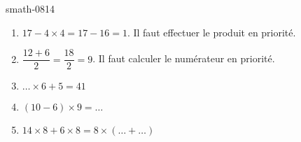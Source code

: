 
\begin{corrige}{smath-0814}

    \begin{enumerate}
        \item
            \( 17-4\times 4=17-16=1\). Il faut effectuer le produit en priorité.
        \item
            \( \dfrac{ 12+6 }{ 2 }=\dfrac{ 18 }{ 2 }=9\). Il faut calculer le numérateur en priorité.
        \item
            \( \ldots \times 6+5=41\)
        \item
            \( (10-6)\times 9=\ldots\)
        \item
            \( 14\times 8+6\times 8=  8\times (\ldots +\ldots)  \)
    \end{enumerate}


\end{corrige}
